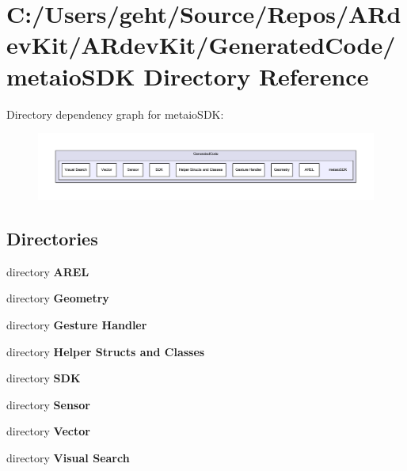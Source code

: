 \section{C\-:/\-Users/geht/\-Source/\-Repos/\-A\-Rdev\-Kit/\-A\-Rdev\-Kit/\-Generated\-Code/metaio\-S\-D\-K Directory Reference}
\label{dir_b823c3ab7b23fb3c75592182c85a7fb5}
Directory dependency graph for metaio\-S\-D\-K\-:
\nopagebreak
\begin{figure}[H]
\begin{center}
\leavevmode
\includegraphics[width=350pt]{dir_b823c3ab7b23fb3c75592182c85a7fb5_dep}
\end{center}
\end{figure}
\subsection*{Directories}
\begin{DoxyCompactItemize}
\item 
directory {\bf A\-R\-E\-L}
\item 
directory {\bf Geometry}
\item 
directory {\bf Gesture Handler}
\item 
directory {\bf Helper Structs and Classes}
\item 
directory {\bf S\-D\-K}
\item 
directory {\bf Sensor}
\item 
directory {\bf Vector}
\item 
directory {\bf Visual Search}
\end{DoxyCompactItemize}
